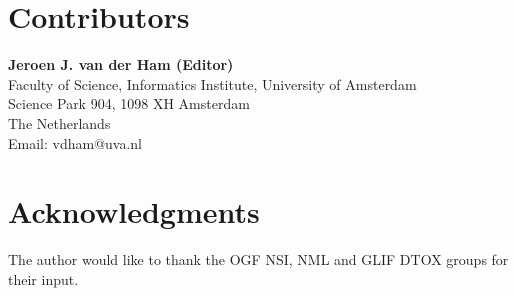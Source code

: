 \documentclass[12pt]{article}  %
\begin{document}
\section{Contributors}

% 
% 
% 

\textbf{Jeroen J. van der Ham (Editor)} \\
Faculty of Science, Informatics Institute, University of Amsterdam \\
Science Park 904, 1098 XH  Amsterdam  \\
The Netherlands \\
Email: vdham@uva.nl \\
\section{Acknowledgments}

The author would like to thank the OGF NSI, NML and GLIF DTOX groups for their input.


 
 
\end{document}
